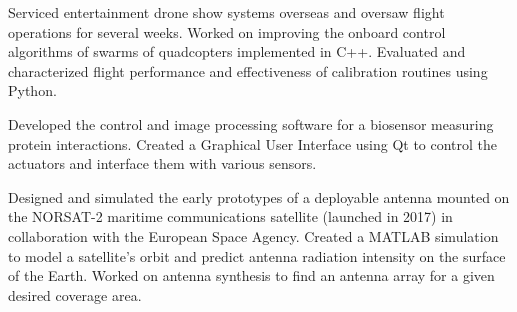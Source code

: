 \documentclass{ResumeTemplate}
\begin{document}
	\begin{tcolorbox}[colback=blue!5!white,colframe=blue!75!black,title=RESEARCH AND INDUSTRY EXPERIENCE]
	

	\workitemsthree
	{Serviced entertainment drone show systems overseas and oversaw flight operations for several weeks.}
	{Worked on improving the onboard control algorithms of swarms of quadcopters implemented in C++.}
	{Evaluated and characterized flight performance and effectiveness of calibration routines using Python.}
	
	
	\workitemstwo
	{Developed the control and image processing software for a biosensor measuring protein interactions.}
	{Created a Graphical User Interface using Qt to control the actuators and interface them with various sensors.}
	

	\workitemstwo
	{Designed and simulated the early prototypes of a deployable antenna mounted on the NORSAT-2 maritime communications satellite (launched in 2017) in collaboration with the European Space Agency.}
	{Created a MATLAB simulation to model a satellite's orbit and predict antenna radiation intensity on the surface of the Earth. Worked on antenna synthesis to find an antenna array for a given desired coverage area.}
	~
	\end{tcolorbox}
	
\end{document}
